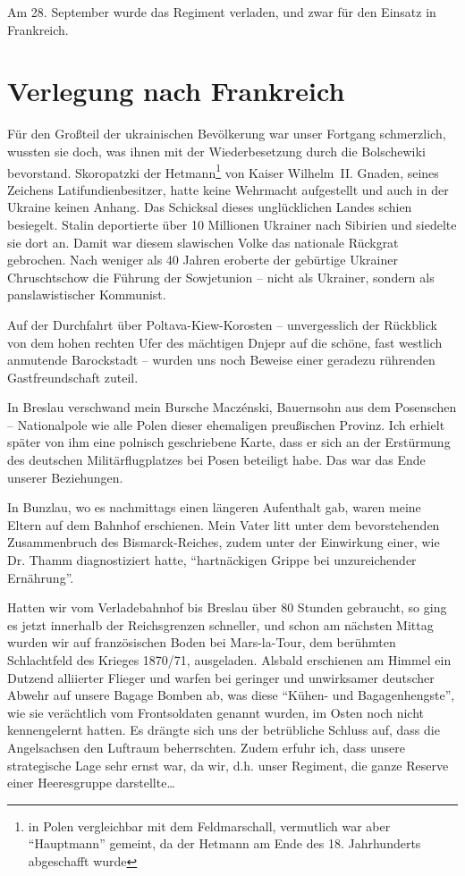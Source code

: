\documentclass[a5paper,pagesize,10pt,twoside=true]{scrbook}
\begin{document}
Am 28. September wurde das Regiment verladen, und zwar für den Einsatz in Frankreich.

\section{Verlegung nach Frankreich}
Für den Großteil der ukrainischen Bevölkerung war unser Fortgang schmerzlich, wussten sie doch, was ihnen mit der Wiederbesetzung durch die Bolschewiki bevorstand. Skoropatzki der Hetmann\footnote{in Polen vergleichbar mit dem Feldmarschall, vermutlich war aber \enquote{Hauptmann} gemeint, da der Hetmann am Ende des 18. Jahrhunderts abgeschafft wurde} von Kaiser Wilhelm~II. Gnaden, seines Zeichens Latifundienbesitzer, hatte keine Wehrmacht aufgestellt und auch in der Ukraine keinen Anhang. Das Schicksal dieses unglücklichen Landes schien besiegelt. Stalin deportierte über 10 Millionen Ukrainer nach Sibirien und siedelte sie dort an. Damit war diesem slawischen Volke das nationale Rückgrat gebrochen. Nach weniger als 40 Jahren eroberte der gebürtige Ukrainer Chruschtschow die Führung der Sowjetunion -- nicht als Ukrainer, sondern als panslawistischer Kommunist.

Auf der Durchfahrt über Poltava-Kiew-Korosten -- unvergesslich der Rückblick von dem hohen rechten Ufer des mächtigen Dnjepr auf die schöne, fast westlich anmutende Barockstadt -- wurden uns noch Beweise einer geradezu rührenden Gastfreundschaft zuteil.

In Breslau verschwand mein Bursche Maczénski, Bauernsohn aus dem Posenschen -- Nationalpole wie alle Polen dieser ehemaligen preußischen Provinz. Ich erhielt später von ihm eine polnisch geschriebene Karte, dass er sich an der Erstürmung des deutschen Militärflugplatzes bei Posen beteiligt habe. Das war das Ende unserer Beziehungen.

In Bunzlau, wo es nachmittags einen längeren Aufenthalt gab, waren meine Eltern auf dem Bahnhof erschienen. Mein Vater litt unter dem bevorstehenden Zusammenbruch des Bismarck-Reiches, zudem unter der Einwirkung einer, wie Dr. Thamm diagnostiziert hatte, \enquote{hartnäckigen Grippe bei unzureichender Ernährung}.

Hatten wir vom Verladebahnhof bis Breslau über 80 Stunden gebraucht, so ging es jetzt innerhalb der Reichsgrenzen schneller, und schon am nächsten Mittag wurden wir auf französischen Boden bei Mars-la-Tour, dem berühmten Schlachtfeld des Krieges 1870/71, ausgeladen. Alsbald erschienen am Himmel ein Dutzend alliierter Flieger und warfen bei geringer und unwirksamer deutscher Abwehr auf unsere Bagage Bomben ab, was diese \enquote{Kühen- und Bagagenhengste}, wie sie verächtlich vom Frontsoldaten genannt wurden, im Osten noch nicht kennengelernt hatten. Es drängte sich uns der betrübliche Schluss auf, dass die Angelsachsen den Luftraum beherrschten. Zudem erfuhr ich, dass unsere strategische Lage sehr ernst war, da wir, d.h. unser Regiment, die ganze Reserve einer Heeresgruppe darstellte\dots
\end{document}

